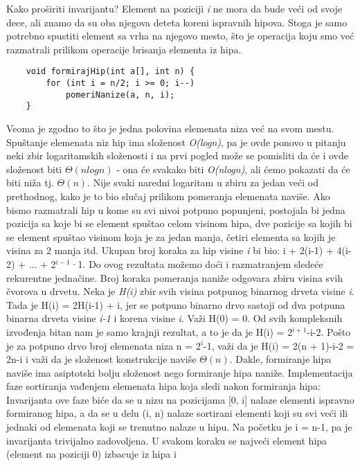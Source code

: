 \documentclass{article}
\begin{document}
Kako proširiti invarijantu? Element na poziciji \textit{i} ne mora da
bude veći od svoje dece, ali znamo da su oba njegova deteta koreni ispravnih
hipova. Stoga je samo potrebno spustiti element sa vrha na njegovo mesto, što je
operacija koju smo već razmatrali prilikom operacije brisanja elementa iz hipa.
\begin{lstlisting}
    void formirajHip(int a[], int n) {
        for (int i = n/2; i >= 0; i--)
            pomeriNanize(a, n, i);
    }
\end{lstlisting}
Veoma je zgodno to što je jedna
polovina elemenata niza već na svom mestu. Spuštanje elemenata niz hip ima
složenost \textit{O(logn)}, pa je ovde ponovo u pitanju neki zbir logaritamskih složenosti
i na prvi pogled može se pomisliti da će i ovde složenost biti $\Theta(nlogn)$ - ona
će svakako biti \textit{O(nlogn)}, ali ćemo pokazati da će biti niža tj. $\Theta(n)$. Nije svaki naredni logaritam u zbiru za jedan veći od prethodnog, kako je to bio
slučaj prilikom pomeranja elemenata naviše. Ako bismo razmatrali hip u kome
su svi nivoi potpuno popunjeni, postojala bi jedna pozicija sa koje bi se element
spuštao celom visinom hipa, dve pozicije sa kojih bi se element spuštao visinom
koja je za jedan manja, četiri elementa sa kojih je visina za 2 manja itd.
Ukupan broj koraka za hip visine \textit{i} bi bio:
i + 2(i-1) + 4(i-2) + ... + 2$^{i-1}$·1.
\newline
Do ovog rezultata možemo doći i razmatranjem sledeće rekurentne jednačine.
Broj koraka pomeranja naniže odgovara zbiru visina svih čvorova u drvetu.
Neka je\textit{ H(i)} zbir svih visina potpunog binarnog drveta visine \textit{i}. Tada je
H(i) = 2H(i-1) + i, jer se potpuno binarno drvo sastoji od dva potpuna
binarna drveta visine \textit{i-1} i korena visine \textit{i}. Važi H(0) = 0.
\newline
Od svih kompleksnih izvođenja bitan nam je samo krajnji rezultat, a to
je da je H(i) = 2$^{i+1}$-i-2. Pošto je za potpuno drvo broj elemenata niza
n = 2$^{i}$-1, važi da je H(i) = 2(n + 1)-i-2 = 2n-i i važi da je složenost
konstrukcije naviše $\Theta(n)$. Dakle, formiranje hipa naviše ima asiptotski bolju
složenost nego formiranje hipa naniže.
\newline
Implementacija faze sortiranja vađenjem elemenata hipa
koja sledi nakon formiranja hipa: Invarijanta ove faze biće da se u nizu na
pozicijama [0, i] nalaze elementi ispravno formiranog hipa, a da se u delu (i, n)
nalaze sortirani elementi koji su svi veći ili jednaki od elemenata koji se trenutno
nalaze u hipu. Na početku je i = n-1, pa je invarijanta trivijalno zadovoljena. U svakom koraku se najveći element hipa (element na poziciji 0) izbacuje iz hipa i
\end{document}
